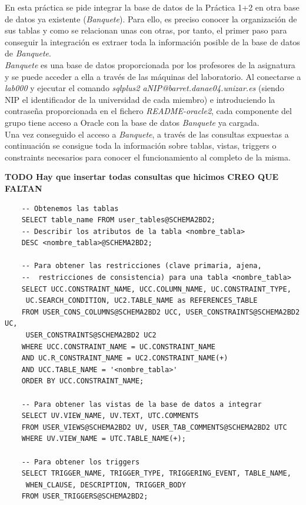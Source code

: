 \documentclass{article}
\begin{document}
En esta práctica se pide integrar la base de datos de la Práctica 1+2 en otra base de datos ya existente (\emph{Banquete}). Para ello, es preciso conocer la organización de sus tablas y como se relacionan unas con otras, por tanto, el primer paso para conseguir la integración es extraer toda la información posible de la base de datos de \emph{Banquete}.\\
\emph{Banquete} es una base de datos proporcionada por los profesores de la asignatura y se puede acceder a ella a través de las máquinas del laboratorio. Al conectarse a \emph{lab000} y ejecutar el comando \emph{sqlplus2 aNIP@barret.danae04.unizar.es} (siendo NIP el identificador de la universidad de cada miembro) e introduciendo la contraseña proporcionada en el fichero \emph{README-oracle2}, cada componente del grupo tiene acceso a Oracle con la base de datos \emph{Banquete} ya cargada.\\
Una vez conseguido el acceso a \emph{Banquete}, a través de las consultas expuestas a continuación se consigue toda la información sobre tablas, vistas, triggers o constraints necesarios para conocer el funcionamiento al completo de la misma. 

\textbf{TODO Hay que insertar todas consultas que hicimos CREO QUE FALTAN}

\begin{lstlisting}
	-- Obtenemos las tablas
	SELECT table_name FROM user_tables@SCHEMA2BD2;
	-- Describir los atributos de la tabla <nombre_tabla>
	DESC <nombre_tabla>@SCHEMA2BD2;

	-- Para obtener las restricciones (clave primaria, ajena,
	--  restricciones de consistencia) para una tabla <nombre_tabla>
	SELECT UCC.CONSTRAINT_NAME, UCC.COLUMN_NAME, UC.CONSTRAINT_TYPE, 
	 UC.SEARCH_CONDITION, UC2.TABLE_NAME as REFERENCES_TABLE
	FROM USER_CONS_COLUMNS@SCHEMA2BD2 UCC, USER_CONSTRAINTS@SCHEMA2BD2 UC,
	 USER_CONSTRAINTS@SCHEMA2BD2 UC2
	WHERE UCC.CONSTRAINT_NAME = UC.CONSTRAINT_NAME
	AND UC.R_CONSTRAINT_NAME = UC2.CONSTRAINT_NAME(+)
	AND UCC.TABLE_NAME = '<nombre_tabla>'
	ORDER BY UCC.CONSTRAINT_NAME;
	
	-- Para obtener las vistas de la base de datos a integrar
	SELECT UV.VIEW_NAME, UV.TEXT, UTC.COMMENTS
	FROM USER_VIEWS@SCHEMA2BD2 UV, USER_TAB_COMMENTS@SCHEMA2BD2 UTC
	WHERE UV.VIEW_NAME = UTC.TABLE_NAME(+);
	
	-- Para obtener los triggers
	SELECT TRIGGER_NAME, TRIGGER_TYPE, TRIGGERING_EVENT, TABLE_NAME,
	 WHEN_CLAUSE, DESCRIPTION, TRIGGER_BODY
	FROM USER_TRIGGERS@SCHEMA2BD2;
\end{lstlisting}
\end{document}
